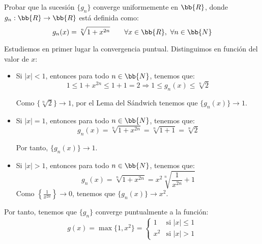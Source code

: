 \begin{ejercicio}
    Probar que la sucesión $\{g_n\}$ converge uniformemente en $\bb{R}$, donde $g_n:\bb{R}\to \bb{R}$ está definida como:
    \begin{equation*}
        g_n(x) = \sqrt[n]{1+x^{2n}} \qquad \forall x\in \bb{R},~\forall n\in \bb{N}
    \end{equation*}

    Estudiemos en primer lugar la convergencia puntual. Distinguimos en función
    del valor de $x$:
    \begin{itemize}
        \item Si $|x| < 1$, entonces para todo $n\in \bb{N}$, tenemos que:
        \begin{equation*}
            1 \leq 1+x^{2n} \leq 1+1 = 2 \Longrightarrow 1 \leq g_n(x) \leq \sqrt[n]{2}
        \end{equation*}

        Como $\{\sqrt[n]{2}\}\to 1$, por el Lema del Sándwich tenemos que $\{g_n(x)\}\to 1$.

        \item Si $|x| = 1$, entonces para todo $n\in \bb{N}$, tenemos que:
        \begin{equation*}
            g_n(x) = \sqrt[n]{1+x^{2n}} = \sqrt[n]{1+1} = \sqrt[n]{2}
        \end{equation*}

        Por tanto, $\{g_n(x)\}\to 1$.

        \item Si $|x| > 1$, entonces para todo $n\in \bb{N}$, tenemos que:
        \begin{equation*}
            g_n(x) = \sqrt[n]{1+x^{2n}} = x^2\sqrt[n]{\frac{1}{x^{2n}}+1}
        \end{equation*}
        Como $\left\{\frac{1}{x^{2n}}\right\}\to 0$, tenemos que $\{g_n(x)\}\to x^2$.
    \end{itemize}

    Por tanto, tenemos que $\{g_n\}$ converge puntualmente a la función:
    \begin{equation*}
        g(x) = \max\{1,x^2\}= \begin{cases}
            1 & \text{si } |x| \leq 1\\
            x^2 & \text{si } |x| > 1
        \end{cases}
    \end{equation*}

\end{ejercicio}



